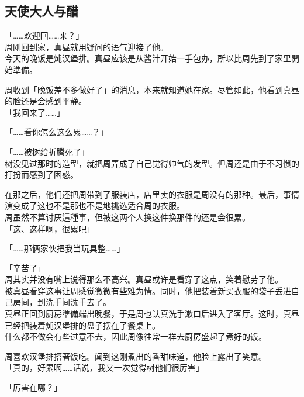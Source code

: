 \subsection{天使大人与醋}

「……欢迎回……来？」\\

周刚回到家，真昼就用疑问的语气迎接了他。\\

今天的晚饭是炖汉堡排。真昼应该是从酱汁开始一手包办，所以比周先到了家里開始準備。

周收到「晚饭差不多做好了」的消息，本来就知道她在家。尽管如此，他看到真昼的脸还是会感到平静。\\

「我回来了……」

「……看你怎么这么累……？」

「……被树给折腾死了」\\

树没见过那时的造型，就把周弄成了自己觉得帅气的发型。但周还是由于不习惯的打扮而感到了困惑。

在那之后，他们还把周带到了服装店，店里卖的衣服是周没有的那种。最后，事情演变成了这也不是那也不是地挑选适合周的衣服。\\

周虽然不算讨厌這種事，但被这两个人换这件换那件的还是会很累。\\

「这、这样啊，很累吧」

「……那俩家伙把我当玩具整……」

「辛苦了」\\

周其实并没有嘴上说得那么不高兴。真昼或许是看穿了这点，笑着慰劳了他。\\

被真昼看穿这事让周感觉微微有些难为情。同时，他把装着新买衣服的袋子丢进自己房间，到洗手间洗手去了。\\

真昼正回到厨房準備端出晚餐，于是周也认真洗手漱口后进入了客厅。这时，真昼已经把装着炖汉堡排的盘子摆在了餐桌上。\\

什么都不做会有些过意不去，因此周像往常一样去厨房盛起了煮好的饭。

周喜欢汉堡排搭著饭吃。闻到这刚煮出的香甜味道，他脸上露出了笑意。\\

「真的，好累啊……话说，我又一次觉得树他们很厉害」

「厉害在哪？」\\

